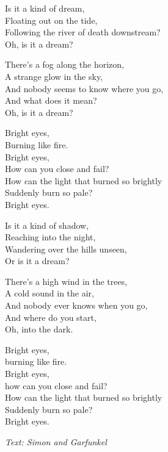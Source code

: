\vspace{10pt}
Is it a kind of dream,\\
Floating out on the tide,\\
Following the river of death downstream?\\
Oh, is it a dream?\par
\vspace{10pt}
There's a fog along the horizon,\\
A strange glow in the sky,\\
And nobody seems to know where you go,\\
And what does it mean?\\
Oh, is it a dream?\par
\newpage
Bright eyes,\\
Burning like fire.\\
Bright eyes,\\
How can you close and fail?\\
How can the light that burned so brightly\\
Suddenly burn so pale?\\
Bright eyes.\par
\vspace{10pt}
Is it a kind of shadow,\\
Reaching into the night,\\
Wandering over the hills unseen,\\
Or is it a dream?\par
\vspace{10pt}
There's a high wind in the trees,\\
A cold sound in the air,\\
And nobody ever knows when you go,\\
And where do you start,\\
Oh, into the dark.\par
\vspace{10pt}
\revrpt Bright eyes,\\
burning like fire.\\
Bright eyes,\\
how can you close and fail?\\
How can the light that burned so brightly\\
Suddenly burn so pale?\\
Bright eyes.\rpt\par
\vspace{10pt}
{\footnotesize\textit{Text: Simon and Garfunkel}}
